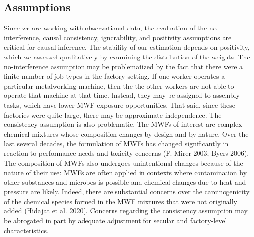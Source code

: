 \documentclass[
  11pt,
]{article}
\begin{document}
\hypertarget{assumptions}{%
\subsection{Assumptions}\label{assumptions}}

Since we are working with observational data, the evaluation of the
no-interference, causal consistency, ignorability, and positivity
assumptions are critical for causal inference. The stability of our
estimation depends on positivity, which we assessed qualitatively by
examining the distribution of the weights. The no-interference
assumption may be problematized by the fact that there were a finite
number of job types in the factory setting. If one worker operates a
particular metalworking machine, then the the other workers are not able
to operate that machine at that time. Instead, they may be assigned to
assembly tasks, which have lower MWF exposure opportunities. That said,
since these factories were quite large, there may be approximate
independence. The consistency assumption is also problematic. The MWFs
of interest are complex chemical mixtures whose composition changes by
design and by nature. Over the last several decades, the formulation of
MWFs has changed significantly in reaction to performance needs and
toxicity concerns (F. Mirer 2003; Byers 2006). The composition of MWFs
also undergoes unintentional changes because of the nature of their use:
MWFs are often applied in contexts where contamination by other
substances and microbes is possible and chemical changes due to heat and
pressure are likely. Indeed, there are substantial concerns over the
carcinogenicity of the chemical species formed in the MWF mixtures that
were not originally added (Hidajat et al. 2020). Concerns regarding the
consistency assumption may be abrogated in part by adequate adjustment
for secular and factory-level characteristics.
\end{document}

